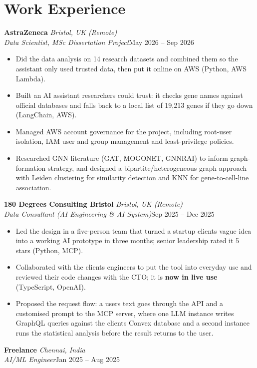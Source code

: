 \documentclass[a4paper,11pt]{article}
\newcommand{\role}[4]{%
  \textbf{#1}{\color{muted}\,\textperiodcentered\,\textit{#2}}\\
  \textit{#4}\hfill{\color{muted}#3}\par}
\newcommand{\gap}{\vspace{5pt}}
\newcommand{\num}[1]{\textbf{#1}}   %
\begin{document}
\section{Work Experience}
\role{AstraZeneca}{Bristol, UK (Remote)}{May 2026 – Sep 2026}{Data Scientist, MSc Dissertation Project}
\begin{itemize}
  \item Did the data analysis on 14 research datasets and combined them so the assistant only used trusted data, then put it online on AWS (Python, AWS Lambda).
  \item Built an AI assistant researchers could trust: it checks gene names against official databases and falls back to a local list of 19,213 genes if they go down (LangChain, AWS).
  \item Managed AWS account governance for the project, including root-user isolation, IAM user and group management and least-privilege policies.
  \item Researched GNN literature (GAT, MOGONET, GNNRAI) to inform graph-formation strategy, and designed a bipartite/heterogeneous graph approach with Leiden clustering for similarity detection and KNN for gene-to-cell-line association.
\end{itemize}
\gap
{}
\role{180 Degrees Consulting Bristol}{Bristol, UK (Remote)}{Sep 2025 – Dec 2025}{Data Consultant (AI Engineering \& AI System)}
\begin{itemize}
  \item Led the design in a five-person team that turned a startup client\textquotesingle{}s vague idea into a working AI prototype in three months; senior leadership rated it 5 stars (Python, MCP).
  \item Collaborated with the client\textquotesingle{}s engineers to put the tool into everyday use and reviewed their code changes with the CTO; it is \num{now in live use} (TypeScript, OpenAI).
  \item Proposed the request flow: a user\textquotesingle{}s text goes through the API and a customised prompt to the MCP server, where one LLM instance writes GraphQL queries against the client\textquotesingle{}s Convex database and a second instance runs the statistical analysis before the result returns to the user.
\end{itemize}
\gap
{}
\role{Freelance}{Chennai, India}{Jan 2025 – Aug 2025}{AI/ML Engineer}
\end{document}
